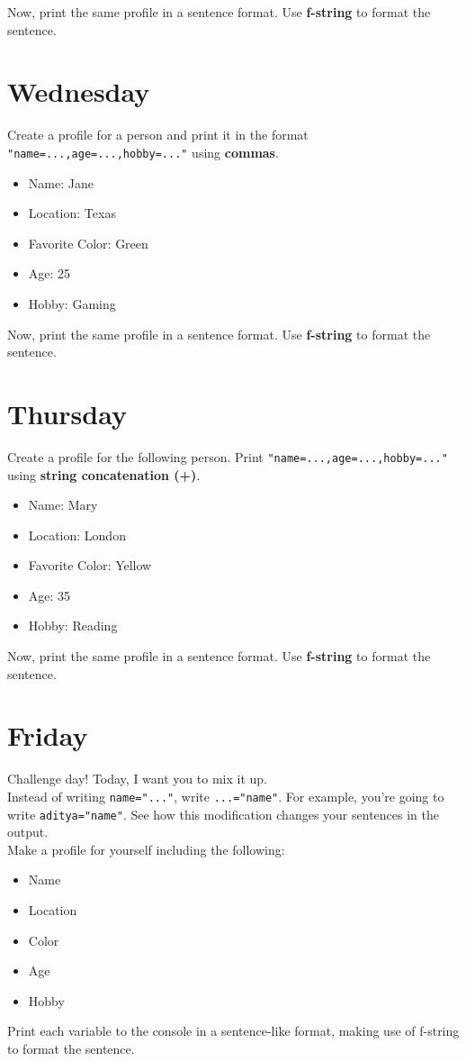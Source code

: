 \documentclass{article}
\begin{document}
Now, print the same profile in a sentence format. Use \textbf{f-string} to format the sentence.

\section{Wednesday}

Create a profile for a person and print it in the format \verb|"name=...,age=...,hobby=..."| using \textbf{commas}.

\begin{itemize}
    \item Name: Jane
    \item Location: Texas
    \item Favorite Color: Green
    \item Age: 25
    \item Hobby: Gaming
\end{itemize}

Now, print the same profile in a sentence format. Use \textbf{f-string} to format the sentence.


\section{Thursday}

Create a profile for the following person. Print \verb|"name=...,age=...,hobby=..."| using \textbf{string concatenation (+)}.

\begin{itemize}
    \item Name: Mary
    \item Location: London
    \item Favorite Color: Yellow
    \item Age: 35
    \item Hobby: Reading
\end{itemize}

Now, print the same profile in a sentence format. Use \textbf{f-string} to format the sentence.

\section{Friday}

Challenge day! Today, I want you to mix it up. \\

Instead of writing \verb|name="..."|, write \verb|...="name"|. For example, you're going to write \verb|aditya="name"|. See how this modification changes your sentences in the output.  \\

Make a profile for yourself including the following:

\begin{itemize}
    \item Name
    \item Location
    \item Color
    \item Age
    \item Hobby
\end{itemize}

Print each variable to the console in a sentence-like format, making use of f-string to format the sentence.
\end{document}

